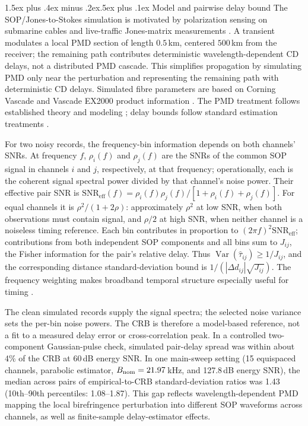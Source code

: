 \documentclass[10pt]{article}
\makeatletter
\renewcommand\section{\@startsection{section}{1}{\z@}%
  {1.5ex plus .4ex minus .2ex}{.5ex plus .1ex}%
  {\normalfont\large\bfseries}}
\newcommand{\SNReff}{\mathrm{SNR}_{\mathrm{eff}}}
\makeatother
\begin{document}
\section{Model and pairwise delay bound}
The SOP/Jones-to-Stokes simulation is motivated by polarization sensing on submarine cables and live-traffic Jones-matrix measurements \cite{mecozzi2021,mecozzi2025}. A transient modulates a local PMD section of length $0.5$\,km, centered $500$\,km from the receiver; the remaining path contributes deterministic wavelength-dependent CD delays, not a distributed PMD cascade. This simplifies propagation by simulating PMD only near the perturbation and representing the remaining path with deterministic CD delays. Simulated fibre parameters are based on Corning Vascade and Vascade EX2000 product information \cite{corning2020,corning2023}. The PMD treatment follows established theory and modeling \cite{gordon2000,shtaif2005,gisin1992}; delay bounds follow standard estimation treatments \cite{weiss1983,sadler2006survey}.

For two noisy records, the frequency-bin information depends on both channels' SNRs. At frequency $f$, $\rho_i(f)$ and $\rho_j(f)$ are the SNRs of the common SOP signal in channels $i$ and $j$, respectively, at that frequency; operationally, each is the coherent signal spectral power divided by that channel's noise power. Their effective pair SNR is $\SNReff(f)=\rho_i(f)\rho_j(f)/[1+\rho_i(f)+\rho_j(f)]$. For equal channels it is $\rho^2/(1+2\rho)$: approximately $\rho^2$ at low SNR, when both observations must contain signal, and $\rho/2$ at high SNR, when neither channel is a noiseless timing reference. Each bin contributes in proportion to $(2\pi f)^2\SNReff$; contributions from both independent SOP components and all bins sum to $J_{ij}$, the Fisher information for the pair's relative delay. Thus $\operatorname{Var}(\hat\tau_{ij})\ge 1/J_{ij}$, and the corresponding distance standard-deviation bound is $1/(|\Delta d_{ij}|\sqrt{J_{ij}})$. The frequency weighting makes broadband temporal structure especially useful for timing \cite{weiss1983,sadler2006survey}.

The clean simulated records supply the signal spectra; the selected noise variance sets the per-bin noise powers. The CRB is therefore a model-based reference, not a fit to a measured delay error or cross-correlation peak. In a controlled two-component Gaussian-pulse check, simulated pair-delay spread was within about 4\% of the CRB at 60\,dB energy SNR. In one main-sweep setting (15 equispaced channels, parabolic estimator, $B_{\rm nom}=21.97$\,kHz, and 127.8\,dB energy SNR), the median across pairs of empirical-to-CRB standard-deviation ratios was 1.43 (10th--90th percentiles: 1.08--1.87). This gap reflects wavelength-dependent PMD mapping the local birefringence perturbation into different SOP waveforms across channels, as well as finite-sample delay-estimator effects.
\end{document}

